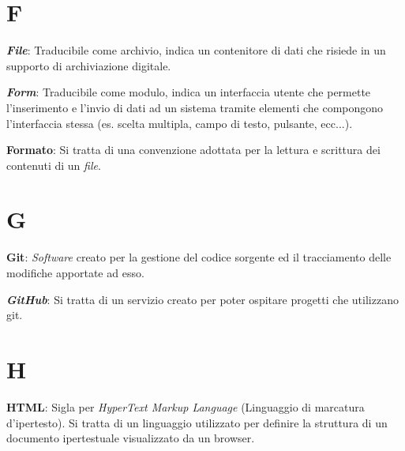 \documentclass[5pt]{article}
\begin{document}
\section*{F}
\begin{flushleft}

\textbf{\textit{File}}: Traducibile come archivio, indica un contenitore di dati che risiede in un supporto di archiviazione digitale.\newline

\textbf{\textit{Form}}: Traducibile come modulo, indica un interfaccia utente che permette l'inserimento e l'invio di dati ad un sistema tramite elementi che compongono l'interfaccia stessa (es. scelta multipla, campo di testo, pulsante, ecc...).\newline

\textbf{Formato}: Si tratta di una convenzione adottata per la lettura e scrittura dei contenuti di un \textit{file}.

\end{flushleft}

\pagebreak

\section*{G}
\begin{flushleft}

\textbf{Git}: \textit{Software} creato per la gestione del codice sorgente ed il tracciamento delle modifiche apportate ad esso.\newline

\textbf{\textit{GitHub}}: Si tratta di un servizio creato per poter ospitare progetti che utilizzano git.

\end{flushleft}

\pagebreak

\section*{H}
\begin{flushleft}

\textbf{HTML}: Sigla per \textit{HyperText Markup Language} (Linguaggio di marcatura d'ipertesto). Si tratta di un linguaggio utilizzato per definire la struttura di un documento ipertestuale visualizzato da un browser.

\end{flushleft}
\end{document}
